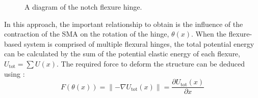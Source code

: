 \begin{figure}[h] %
  \centering
  \caption{A diagram of the notch flexure hinge.}
  \label{fig:notch-flexure}
\end{figure}

In this approach, the important relationship to obtain is the influence of the contraction of the SMA on the rotation of the hinge, $\theta(x)$. When the flexure-based system is comprised of multiple flexural hinges, the total potential energy can be calculated by the sum of the potential elastic energy of each flexure, $U_\mathrm{tot}=\sum U(x)$. The required force to deform the structure can be deduced using :
\begin{equation}\label{eq:flexure-hinge-force}
    F(\theta(x)) = \lVert -\nabla{U_\text{tot}(x)}\rVert = \frac{\partial U_\text{tot}(x)}{\partial x}
\end{equation}

